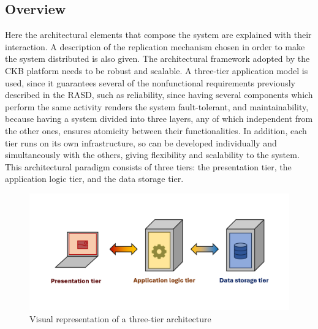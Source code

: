\subsection{Overview}
 Here the architectural elements that compose the system are explained with their interaction. A description of the replication mechanism chosen in order to make the system distributed is also given.
The architectural framework adopted by the CKB platform needs to be robust and scalable. A three-tier application model is used, since it guarantees several of the nonfunctional requirements previously described in the RASD, such as reliability, since having several components which perform the same activity renders the system fault-tolerant, and maintainability, because having a system divided into three layers, any of which independent from the other ones, ensures atomicity between their functionalities. In addition, each tier runs on its own infrastructure, so can be developed individually and simultaneously with the others, giving flexibility and scalability to the system.
This architectural paradigm consists of three tiers: the presentation tier, the application logic tier, and the data storage tier.

\begin{figure}[H]
    \centering
    \includegraphics[width=0.9\linewidth]{Images/Threetiers.png}
    \caption{Visual representation of a three-tier architecture}
    \label{fig:enter-label}
\end{figure}

